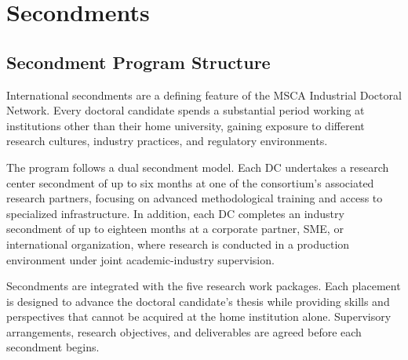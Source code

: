 \chapter{Secondments}
\label{ch:secondments}

\section{Secondment Program Structure}
\label{sec:secondment-structure}

International secondments are a defining feature of the MSCA Industrial
Doctoral Network.  Every doctoral candidate spends a substantial period working
at institutions other than their home university, gaining exposure to different
research cultures, industry practices, and regulatory environments.

The program follows a dual secondment model.  Each DC undertakes a research
center secondment of up to six months at one of the consortium's associated
research partners, focusing on advanced methodological training and access to
specialized infrastructure.  In addition, each DC completes an industry
secondment of up to eighteen months at a corporate partner, SME, or
international organization, where research is conducted in a production
environment under joint academic-industry supervision.

Secondments are integrated with the five research work packages.  Each
placement is designed to advance the doctoral candidate's thesis while
providing skills and perspectives that cannot be acquired at the home
institution alone.  Supervisory arrangements, research objectives, and
deliverables are agreed before each secondment begins.

\vspace{8pt}

